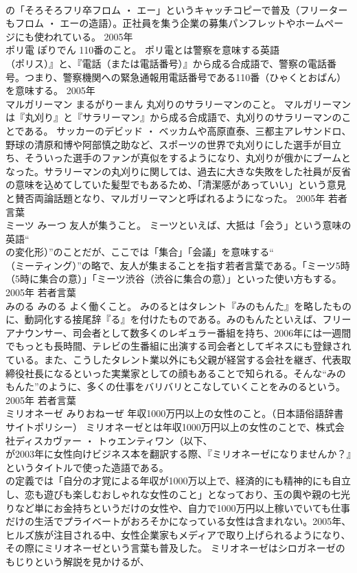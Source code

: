 \documentclass[8pt]{extreport}
\begin{document}
\begin{CJK}{UTF8}{min}
\\	の「そろそろフリ卒フロム ・ エー」というキャッチコピーで普及（フリーターもフロム ・ エーの造語）。正社員を集う企業の募集パンフレットやホームページにも使われている。	2005年	
\\	ポリ電	ぽりでん	110番のこと。	ポリ電とは警察を意味する英語
\\	（ポリス）』と、『電話（または電話番号）』から成る合成語で、警察の電話番号。つまり、警察機関への緊急通報用電話番号である110番（ひゃくとおばん）を意味する。	2005年	
\\	マルガリーマン	まるがりーまん	丸刈りのサラリーマンのこと。	マルガリーマンは『丸刈り』と『サラリーマン』から成る合成語で、丸刈りのサラリーマンのことである。 サッカーのデビッド ・ ベッカムや高原直泰、三都主アレサンドロ、野球の清原和博や阿部慎之助など、スポーツの世界で丸刈りにした選手が目立ち、そういった選手のファンが真似をするようになり、丸刈りが俄かにブームとなった。サラリーマンの丸刈りに関しては、過去に大きな失敗をした社員が反省の意味を込めてしていた髪型でもあるため、「清潔感があっていい」という意見と賛否両論話題となり、マルガリーマンと呼ばれるようになった。	2005年	若者言葉	
\\	ミーツ	みーつ	友人が集うこと。	ミーツといえば、大抵は「会う」という意味の英語“
\\	の変化形）”のことだが、ここでは「集合」「会議」を意味する“
\\	（ミーティング）”の略で、友人が集まることを指す若者言葉である。「ミーツ5時（5時に集合の意）」「ミーツ渋谷（渋谷に集合の意）」といった使い方もする。	2005年	若者言葉	
\\	みのる	みのる	よく働くこと。	みのるとはタレント『みのもんた』を略したものに、動詞化する接尾辞『る』を付けたものである。みのもんたといえば、フリーアナウンサー、司会者として数多くのレギュラー番組を持ち、2006年には一週間でもっとも長時間、テレビの生番組に出演する司会者としてギネスにも登録されている。また、こうしたタレント業以外にも父親が経営する会社を継ぎ、代表取締役社長になるといった実業家としての顔もあることで知られる。そんな“みのもんた”のように、多くの仕事をバリバリとこなしていくことをみのるという。	2005年	若者言葉	
\\	ミリオネーゼ	みりおねーぜ	年収1000万円以上の女性のこと。（日本語俗語辞書サイトポリシー）	ミリオネーゼとは年収1000万円以上の女性のことで、株式会社ディスカヴァー ・ トゥエンティワン（以下、
\\	が2003年に女性向けビジネス本を翻訳する際、『ミリオネーゼになりませんか？』というタイトルで使った造語である。
\\	の定義では「自分の才覚による年収が1000万以上で、経済的にも精神的にも自立し、恋も遊びも楽しむおしゃれな女性のこと」となっており、玉の輿や親の七光りなど単にお金持ちというだけの女性や、自力で1000万円以上稼いでいても仕事だけの生活でプライベートがおろそかになっている女性は含まれない。2005年、ヒルズ族が注目される中、女性企業家もメディアで取り上げられるようになり、その際にミリオネーゼという言葉も普及した。 ミリオネーゼはシロガネーゼのもじりという解説を見かけるが、

\end{CJK}
\end{document}
